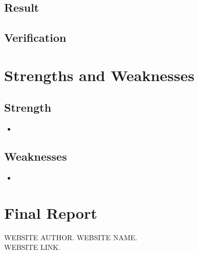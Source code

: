 \documentclass[12pt]{article}
\newcommand{\wholepages}{PAGE HERE}
\theoremstyle{definition}
\theoremstyle{remark}
\numberwithin{equation}{section}
\begin{document}
	\subsection{Result}

	\subsection{Verification}

\newpage
\section{Strengths and Weaknesses}
	\subsection{Strength}
		\begin{itemize}
			\item \textbf{}
		\end{itemize}

	\subsection{Weaknesses}
		\begin{itemize}
			\item \textbf{}
		\end{itemize}

\newpage
\section{Final Report}


\newpage
\thispagestyle{empty}
\renewcommand\refname{Reference}
\clearpage
{}
\begin{thebibliography}{100}
	 WEBSITE AUTHOR. WEBSITE NAME.\\ WEBSITE LINK.

\end{thebibliography}
	
\end{document}
